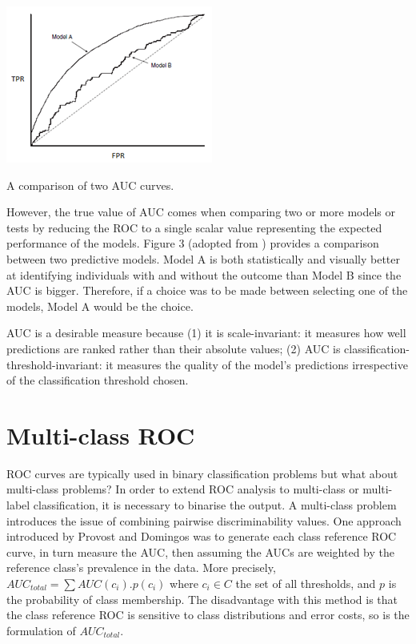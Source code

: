 \begin{marginfigure}
	\includegraphics{roc_curves/Figure3.png}
	\caption{A comparison of two AUC curves.}
	\label{fig:two-curves}
\end{marginfigure}

However, the true value of AUC comes when comparing two or more models or tests by reducing the ROC to a single scalar value representing the expected performance of the models. Figure 3 (adopted from \citep{linden2006diagpreddismgmt}) provides a comparison between two predictive models. Model A is both statistically and visually better at identifying individuals with and without the outcome than Model B since the AUC is bigger. Therefore, if a choice was to be made between selecting one of the models, Model A would be the choice.

AUC is a desirable measure because (1) it is scale-invariant: it measures how well predictions are ranked rather than their absolute values; (2) AUC is classification-threshold-invariant: it measures the quality of the model’s predictions irrespective of the classification threshold chosen.

\section{Multi-class ROC} 
ROC curves are typically used in binary classification problems but what about multi-class problems? In order to extend ROC analysis to multi-class or multi-label classification, it is necessary to binarise the output. A multi-class problem introduces the issue of combining pairwise discriminability values. One approach introduced by Provost and Domingos \citep{provost2003treeind} was to generate each class reference ROC curve, in turn measure the AUC, then assuming the AUCs are weighted by the reference class’s prevalence in the data. More precisely, $AUC_{total} = \sum AUC(c_{i}).p(c_{i})$ where $c_{i}\in C$ the set of all thresholds, and $p$ is the probability of class membership.
The disadvantage with this method is that the class reference ROC is sensitive to class distributions and error costs, so is the formulation of $AUC_{total}$.

